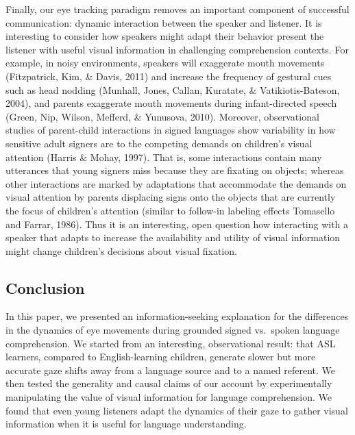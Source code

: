 \documentclass[english,floatsintext,man]{apa6}
\begin{document}
Finally, our eye tracking paradigm removes an important component of
successful communication: dynamic interaction between the speaker and
listener. It is interesting to consider how speakers might adapt their
behavior present the listener with useful visual information in
challenging comprehension contexts. For example, in noisy environments,
speakers will exaggerate mouth movements (Fitzpatrick, Kim, \& Davis,
2011) and increase the frequency of gestural cues such as head nodding
(Munhall, Jones, Callan, Kuratate, \& Vatikiotis-Bateson, 2004), and
parents exaggerate mouth movements during infant-directed speech (Green,
Nip, Wilson, Mefferd, \& Yunusova, 2010). Moreover, observational
studies of parent-child interactions in signed languages show
variability in how sensitive adult signers are to the competing demands
on children's visual attention (Harris \& Mohay, 1997). That is, some
interactions contain many utterances that young signers miss because
they are fixating on objects; whereas other interactions are marked by
adaptations that accommodate the demands on visual attention by parents
displacing signs onto the objects that are currently the focus of
children's attention (similar to follow-in labeling effects Tomasello
and Farrar, 1986). Thus it is an interesting, open question how
interacting with a speaker that adapts to increase the availability and
utility of visual information might change children's decisions about
visual fixation.

\hypertarget{conclusion}{%
\subsection{Conclusion}\label{conclusion}}

In this paper, we presented an information-seeking explanation for the
differences in the dynamics of eye movements during grounded signed
vs.~spoken language comprehension. We started from an interesting,
observational result: that ASL learners, compared to English-learning
children, generate slower but more accurate gaze shifts away from a
language source and to a named referent. We then tested the generality
and causal claims of our account by experimentally manipulating the
value of visual information for language comprehension. We found that
even young listeners adapt the dynamics of their gaze to gather visual
information when it is useful for language understanding.
\end{document}
